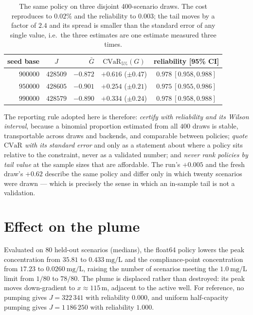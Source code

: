 \begin{table}[htbp]
\centering
\caption{The same policy on three disjoint \num{400}-scenario draws.  The cost
reproduces to $0.02\%$ and the reliability to $0.003$; the tail moves by a factor
of $2.4$ and its spread is smaller than the standard error of any single value,
i.e.\ the three estimates are one estimate measured three times.}
\label{tab:tail-draws}
\begin{tabular}{rcrcc}
\toprule
seed base & $J$ & $\bar G$ & $\mathrm{CVaR}_{5\%}(G)$ & reliability [95\% CI] \\
\midrule
$900000$ & $\num{428509}$ & $-0.872$ & $+0.616$ ($\pm0.47$) & $0.978\ [0.958,0.988]$ \\
$950000$ & $\num{428605}$ & $-0.901$ & $+0.254$ ($\pm0.21$) & $0.975\ [0.955,0.986]$ \\
$990000$ & $\num{428579}$ & $-0.890$ & $+0.334$ ($\pm0.24$) & $0.978\ [0.958,0.988]$ \\
\bottomrule
\end{tabular}
\end{table}

The reporting rule adopted here is therefore: \emph{certify with reliability and
its Wilson interval}, because a binomial proportion estimated from all $\num{400}$
draws is stable, transportable across draws and backends, and comparable between
policies; \emph{quote $\mathrm{CVaR}$ with its standard error} and only as a
statement about where a policy sits relative to the constraint, never as a
validated number; and \emph{never rank policies by tail value} at the sample sizes
that are affordable.  The run's $+0.005$ and the fresh draw's $+0.62$ describe the
same policy and differ only in which twenty scenarios were drawn --- which is
precisely the sense in which an in-sample tail is not a validation.

\section{Effect on the plume}

Evaluated on $80$ held-out scenarios (medians), the float64 policy lowers the peak
concentration from $35.81$ to $0.433\ \mathrm{mg/L}$ and the compliance-point
concentration from $17.23$ to $0.0260\ \mathrm{mg/L}$, raising the number of
scenarios meeting the $1.0\ \mathrm{mg/L}$ limit from $1/80$ to $78/80$.  The
plume is displaced rather than destroyed: its peak moves down-gradient to
$x\approx115$\,m, adjacent to the active well.  For reference, no pumping gives
$J=322\,341$ with reliability $0.000$, and uniform half-capacity pumping gives
$J=1\,186\,250$ with reliability $1.000$.

